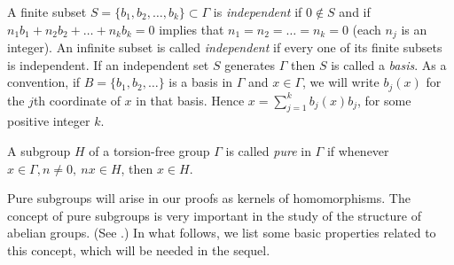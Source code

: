 \begin{remarks}
{\rm  A finite subset 
$S=\{b_1,b_2,\ldots ,b_k\}\subset \Gamma$ 
is {\em independent} if $0\not\in S$ and if 
$n_1 b_1+n_2 b_2+\ldots +n_k b_k=0$ 
implies that $n_1=n_2=\ldots =n_k=0$
(each $n_j$ is an integer).  
An infinite subset is called {\em independent} 
if every one of its finite subsets is independent.  
If an independent set $S$ generates $\Gamma$
then $S$ is called a {\em basis}.  As a convention,
if $B=\{b_1,b_2, \ldots\}$ is a basis in
$\Gamma$ and $x\in \Gamma$, we will
write
$b_j(x)$ for the $j$th coordinate of $x$ in that basis.
Hence $x=\sum_{j=1}^kb_j(x)b_j$, for some positive integer $k$.}
\label{remarks}
\end{remarks}
\begin{defn}
{\rm 
A subgroup $H$ of a torsion-free 
 group $\Gamma$ is called {\em pure} in $\Gamma$ 
 if whenever $x\in \Gamma , n\neq 0,\ n x \in H$, then
 $x\in H$.  }
\label{defn}
\end{defn}
Pure subgroups will arise in our
proofs as kernels of 
homomorphisms.  The concept of pure subgroups
is very important in the study of the structure of abelian
groups.  (See \cite[Appendix A]{hr1}.)
In what follows, we list some basic properties
 related to this concept, which will be needed in the sequel.
